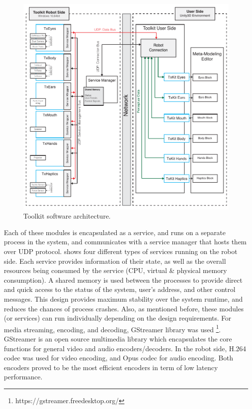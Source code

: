 \begin{figure}[t!]
\centering
  \captionsetup{justification=centering}
\includegraphics[width=1\textwidth]{figures/system/TxKitSystem.pdf}
\caption{Toolkit software architecture.}
  \label{fig:system-txkit-software}
\end{figure}

Each of these modules is encapsulated as a service, and runs on a separate process in the system, and communicates with a service manager that hosts them over UDP protocol.  shows four different types of services running on the robot side. Each service provides information of their state, as well as the overall resources being consumed by the service (CPU, virtual \& physical memory consumption). A shared memory is used between the processes to provide direct and quick access to the status of the system, user's address, and other control messages. This design provides maximum stability over the system runtime, and reduces the chances of process crashes. Also, as mentioned before, these modules (or services) can run individually depending on the design requirements. For media streaming, encoding, and decoding, GStreamer library was used \footnote{https://gstreamer.freedesktop.org/}. GStreamer is an open source multimedia library which encapsulates the core functions for general video and audio encoders/decoders. In the robot side, H.264 codec was used for video encoding, and Opus codec for audio encoding. Both encoders proved to be the most efficient encoders in term of low latency performance.


